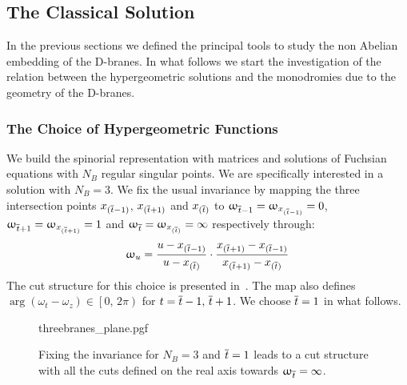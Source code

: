 \subsection{The Classical Solution}

In the previous sections we defined the principal tools to study the non Abelian embedding of the D-branes.
In what follows we start the investigation of the relation between the hypergeometric solutions and the monodromies due to the geometry of the D-branes.


\subsubsection{The Choice of Hypergeometric Functions}

We build the spinorial representation with  matrices and solutions of Fuchsian equations with $N_B$ regular singular points.
We are specifically interested in a solution with $N_B = 3$.
We fix the usual  invariance by mapping the three intersection points $x_{(\overline{t}-1)}$, $x_{(\overline{t}+1)}$ and $x_{(\overline{t})}$ to $\upomega_{\overline{t}-1} = \upomega_{x_{(\overline{t}-1)}} = 0$, $\upomega_{\overline{t}+1} = \upomega_{x_{(\overline{t}+1)}} = 1$ and $\upomega_{\overline{t}} = \upomega_{x_{(\overline{t})}} = \infty$ respectively through:
\begin{equation}
  \upomega_{u}
  =
  \frac{u - x_{(\overline{t}-1)}}{u - x_{(\overline{t})}}
  \cdot
  \frac{x_{(\overline{t}+1)} - x_{(\overline{t}-1)}}{x_{(\overline{t}+1)} - x_{(\overline{t})}}
  \label{eq:def_omega}
\end{equation}
The cut structure for this choice is presented in~.
The map also defines $\arg(\omega_t - \omega_z) \in \left[ 0,\, 2\pi \right)$ for $t = \overline{t}-1,\, \overline{t}+1$.
We choose $\overline{t} = 1$ in what follows.

\begin{figure}[tbp]
  \centering
  {threebranes_plane.pgf}
  \caption{%
    Fixing the  invariance for $N_B = 3$ and $\overline{t} = 1$ leads to a cut structure with all the cuts defined on the real axis towards $\upomega_{\overline{t}} = \infty$.}
  \label{fig:hypergeometric_cuts}
\end{figure}

